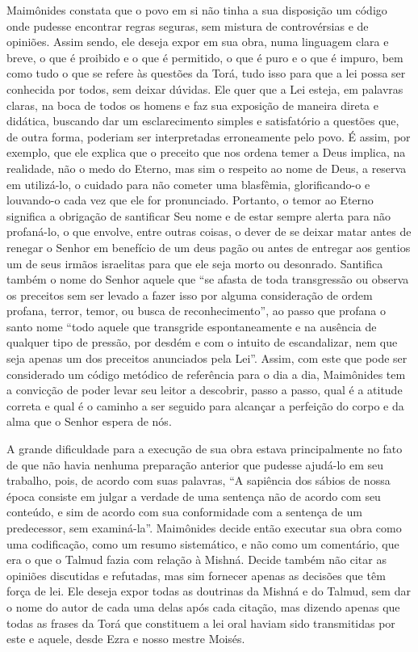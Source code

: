 Maimônides constata que o povo em si não tinha a sua disposição um
código onde pudesse encontrar regras seguras, sem mistura de
controvérsias e de opiniões. Assim sendo, ele deseja expor em sua obra,
numa linguagem clara e breve, o que é proibido e o que é permitido, o
que é puro e o que é impuro, bem como tudo o que se refere às questões
da Torá, tudo isso para que a lei possa ser conhecida por todos,
sem deixar dúvidas. Ele quer que a Lei esteja, em palavras claras, na
boca de todos os homens e faz sua exposição de maneira direta e
didática, buscando dar um esclarecimento simples e satisfatório a
questões que, de outra forma, poderiam ser interpretadas erroneamente
pelo povo. É assim, por exemplo, que ele explica que o preceito que nos
ordena temer a Deus implica, na realidade, não o medo do Eterno, mas
sim o respeito ao nome de Deus, a reserva em utilizá-lo, o cuidado para
não cometer uma blasfêmia, glorificando-o e louvando-o cada vez que ele
for pronunciado. Portanto, o temor ao Eterno significa a obrigação de
santificar Seu nome e de estar sempre alerta para não profaná-lo, o que
envolve, entre outras coisas, o dever de se deixar matar antes de
renegar o Senhor em benefício de um deus pagão ou antes de entregar aos
gentios um de seus irmãos israelitas para que ele seja morto ou
desonrado. Santifica também o nome do Senhor aquele que ``se afasta de
toda transgressão ou observa os preceitos sem ser levado a fazer isso
por alguma consideração de ordem profana, terror, temor, ou busca de
reconhecimento'', ao passo que profana o santo nome ``todo aquele que
transgride espontaneamente e na ausência de qualquer tipo de pressão,
por desdém e com o intuito de escandalizar, nem que seja apenas um dos
preceitos anunciados pela Lei''. Assim, com este que pode ser considerado
um código metódico de referência para o dia a dia, Maimônides tem a
convicção de poder levar seu leitor a descobrir, passo a passo, qual é a
atitude correta e qual é o caminho a ser seguido para alcançar a
perfeição do corpo e da alma que o Senhor espera de nós.

A grande dificuldade para a execução de sua obra estava principalmente
no fato de que não havia nenhuma preparação anterior que pudesse
ajudá-lo em seu trabalho, pois, de acordo com suas palavras, ``A
sapiência dos sábios de nossa época consiste em julgar a verdade de uma
sentença não de acordo com seu conteúdo, e sim de acordo com sua
conformidade com a sentença de um predecessor, sem examiná-la''.
Maimônides decide então executar sua obra como uma codificação, como um
resumo sistemático, e não como um comentário, que era o que o
Talmud fazia com relação à Mishná. Decide também não citar
as opiniões discutidas e refutadas, mas sim fornecer apenas as decisões
que têm força de lei. Ele deseja expor todas as doutrinas da
Mishná e do Talmud, sem dar o nome do autor de cada uma
delas após cada citação, mas dizendo apenas que todas as frases da
Torá que constituem a lei oral haviam sido transmitidas por este
e aquele, desde Ezra e nosso mestre Moisés.

